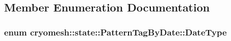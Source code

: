 \subsection{\-Member \-Enumeration \-Documentation}
\hypertarget{classcryomesh_1_1state_1_1PatternTagByDate_a0fe44df3214c9397e04ff9a4e8c57ad9}{
\subsubsection[{\-Date\-Type}]{\setlength{\rightskip}{0pt plus 5cm}enum {\bf cryomesh\-::state\-::\-Pattern\-Tag\-By\-Date\-::\-Date\-Type}}}\label{classcryomesh_1_1state_1_1PatternTagByDate_a0fe44df3214c9397e04ff9a4e8c57ad9}
